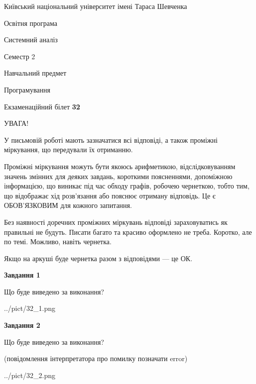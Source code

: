 \documentclass[12pt, ukrainian]{article}
\begin{document}
{{\begin {small}\par
{ \center  Київський національний університет імені Тараса Шевченка \par}
{\parbox {5 cm}{Освітня програма \hfill}{\parbox {7 cm}{Системний аналіз \hfill}}\parbox {6 cm}{\hfill Семестр 2}}\par
{\parbox {5 cm} {Навчальний предмет \hfill}\parbox {7 cm}{Програмування \hfill}\parbox {6cm}{\hfill}\par}\vspace{-7pt} \end{small}}{\center Екзаменаційний білет \No \textbf
{ 32 }\par}}
{
\begin {large}
УВАГА!

У письмовій роботі мають зазначатися всі відповіді, а також проміжні міркування, що передували їх отриманню.

Проміжні міркування можуть бути якоюсь арифметикою, відслідковуванням зна\-чень змінних для деяких завдань,
короткими поясненнями, допоміжною інформацією, що виникає під час обходу графів, робочею чернеткою,
тобто тим, що відображає хід розв’язання або пояснює отриману відповідь.
Це є ОБОВ’ЯЗКОВИМ для кожного запитання.

Без наявності доречних проміжних міркувань відповіді зараховуватись як правиль\-ні не будуть.
Писати багато та красиво оформлено не треба. Коротко, але по темі. Можли\-во, навіть чернетка.

Якщо на аркуші буде чернетка разом з відповідями --- це ОК.

\newpage

{\begin {center}\textbf{Завдання 1}\end {center}}\par
Що буде виведено за виконання?\par
\begin{center}
	{../pict/32_1.png}
\end{center}
\newpage

{\begin {center}\textbf{Завдання 2}\end {center}}\par
Що буде виведено за виконання?\par
 (повідомлення інтерпретатора про помилку позначати error)\par
\begin{center}
	{../pict/32_2.png}
\end{center}
\newpage


\end{large}}
\end{document}
